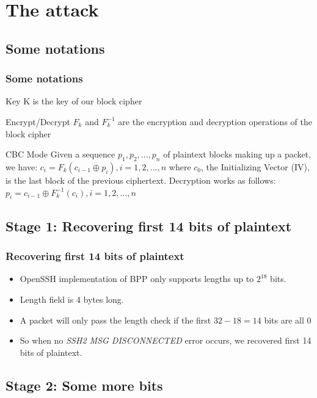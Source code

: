\documentclass[fleqn]{beamer}
\begin{document}
\section{The attack}

\subsection{Some notations}

   \begin{frame}
    \frametitle{Some notations}
    \begin{block}{Key}
	    K is the key of our block cipher
    \end{block}
     \begin{block}{Encrypt/Decrypt}
	    $F_k$ and $F^{-1}_k$ are the encryption and decryption operations of the block cipher
    \end{block}
         \begin{block}{CBC Mode}
	    Given a sequence $p_1,p_2,...,p_n$ of plaintext blocks making up a packet, we have: 
$c_i = F_k(c_{i-1} \oplus p_i), i = 1,2,...,n$
where $c_0$, the Initializing Vector (IV), is the last block of the previous ciphertext. Decryption works as follows: $p_i = c_{i-1} \oplus F^{-1}_k(c_i), i = 1,2,...,n$
    \end{block}
  \end{frame}

\subsection{Stage 1: Recovering first 14 bits of plaintext}
  
   \begin{frame}
    \frametitle{Recovering first 14 bits of plaintext}
        \begin{itemize}
      \item OpenSSH implementation of BPP only supports lengths up to $2^{18}$ bits.
      \item Length field is 4 bytes long.
      \item A packet will only pass the length check if the first $32-18=14$ bits are all 0
      \item So when no \textit{SSH2 MSG DISCONNECTED} error occurs, we recovered first 14 bits of plaintext.
    \end{itemize}
   \end{frame}
 
 \subsection{Stage 2: Some more bits}
  
\end{document}
